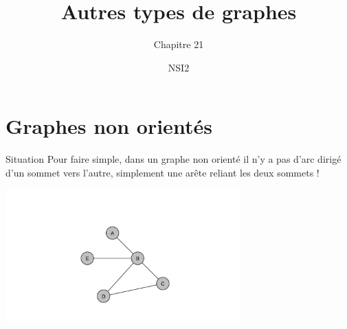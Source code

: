 \documentclass[10pt]{beamer}
\title{Autres types de graphes}
\subtitle{Chapitre 21}
\author{NSI2}
\begin{document}
\maketitle

\section{Graphes non orientés}

\begin{frame}{Situation}
Pour faire simple, dans un graphe non orienté il n'y a pas d'arc dirigé d'un sommet vers l'autre, simplement une arête reliant les deux sommets !

\begin{center}
\includegraphics[width=9cm]{img/graph1}
\end{center}
\end{frame}
\end{document}
